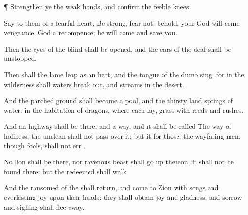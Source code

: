 {\par }{\PP {}¶
Strengthen ye the
weak
hands, and
confirm the
feeble
knees.

Say to them
{} of a
fearful
heart, Be
strong,
fear not: behold, your
God will
come
{}
vengeance,
{}
God
{} a
recompence; he will
come and
save you.


\par }{\PP {}Then the
eyes of the
blind shall be
opened, and the
ears of the
deaf shall be
unstopped.

Then shall the
lame
{}
leap as an
hart, and the
tongue of the
dumb
sing: for in the
wilderness shall
waters break
out, and
streams in the
desert.

And the parched
ground shall become a
pool, and the thirsty
land
springs of
water: in the
habitation of
dragons, where each
lay,
{}
grass with
reeds and
rushes.

And an
highway shall be there, and a
way, and it shall be
called The
way of
holiness; the
unclean shall not pass
over it; but it
{} for those: the wayfaring
men, though
fools, shall not
err
{}.

No
lion shall be there, nor
{}
ravenous
beast shall go
up thereon, it shall not be
found there; but the
redeemed shall
walk
{}

And the
ransomed of the
{} shall
return, and
come to
Zion with
songs and
everlasting
joy upon their
heads: they shall
obtain
joy and
gladness, and
sorrow and
sighing shall flee
away.




\par }
